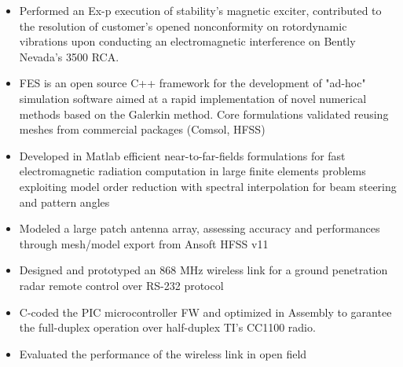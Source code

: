 \documentclass[9pt,a4paper,ragged2e,withhyper]{altacv} %
\begin{document}
\begin{paracol}{2}
\begin{itemize}
\item Performed an Ex-p execution of stability’s magnetic exciter, contributed to the
resolution of customer’s opened nonconformity on rotordynamic vibrations upon
conducting an electromagnetic interference on Bently Nevada's 3500 RCA.
\end{itemize}
\divider

\begin{itemize}
\item FES is an open source C++ framework for the development of "ad-hoc" simulation
software aimed at a rapid implementation of novel numerical methods based on the
Galerkin method. Core formulations validated reusing meshes from commercial
packages (Comsol, HFSS)
\end{itemize}
\divider

\begin{itemize}
\item Developed in Matlab efficient near-to-far-fields formulations for fast electromagnetic radiation computation in large finite elements problems exploiting model order
reduction with spectral interpolation for beam steering and pattern angles
\item Modeled a large patch antenna array, assessing accuracy and performances through mesh/model export from Ansoft HFSS v11
\end{itemize}
\divider


\begin{itemize}
    \item Designed and prototyped an 868 MHz wireless link for a ground penetration radar
remote control over RS-232 protocol
\item C-coded the PIC microcontroller FW and
optimized in Assembly to garantee the full-duplex operation over half-duplex TI’s
CC1100 radio. 
\item Evaluated the performance of the wireless link in open field
\end{itemize}



\end{paracol}
\end{document}
